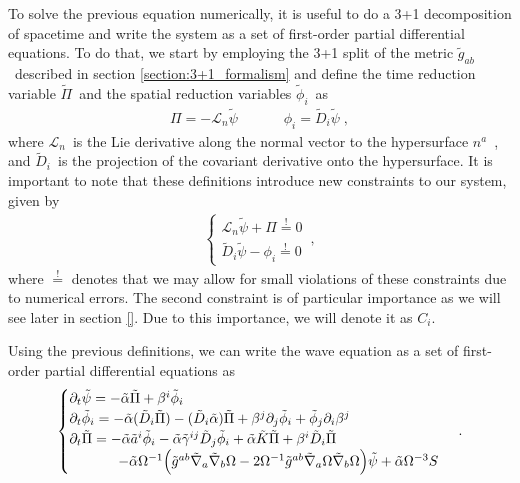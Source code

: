 To solve the previous equation numerically, it is useful to do a 3+1 decomposition of spacetime and write the system as a set of first-order partial differential equations. To do that, we start by employing the 3+1 split of the metric $\tilde{g}_{ab}$~described in section \ref{section:3+1_formalism} and define the time reduction variable $\tilde{\Pi}$~and the spatial reduction variables $\tilde{\phi}_i$~as
%
\begin{align}
    \Pi = - \mathcal{L}_n \tilde{\psi} \;  \quad \quad \quad \phi_i = \tilde{D}_i \tilde{\psi} \; ,
\end{align}
%
where $\mathcal{L}_n$~is the Lie derivative along the normal vector to the hypersurface $n^a$~, and $\tilde{D}_i$~is the projection of the covariant derivative onto the hypersurface. It is important to note that these definitions introduce new constraints to our system, given by
%
\begin{align}
    \begin{cases}
        \mathcal{L}_n \tilde{\psi} + \Pi \overset{!}{=} 0 \\
        \tilde{D}_i \tilde{\psi} - \phi_i \overset{!}{=} 0
    \end{cases}\,,
\end{align}
%
where $\overset{!}{=}$ denotes that we may allow for small violations of these constraints due to numerical errors. The second constraint is of particular importance as we will see later in section \ref{}. Due to this importance, we will denote it as $C_i$.

Using the previous definitions, we can write the wave equation as a set of first-order partial differential equations as
%
\begin{align}
    \begin{cases}
        \partial_t \tilde{\psi} = - \tilde{\alpha} \tilde{\Pi} + \beta^i \tilde{\phi}_i \\
        \partial_t \tilde{\phi}_i = - \tilde{\alpha} (\tilde{D}_i \tilde{\Pi}) - (\tilde{D}_i \tilde{\alpha}) \tilde{\Pi} + \beta^j \partial_j \tilde{\phi}_i + \tilde{\phi}_j \partial_i \beta^j \\
        \partial_t \tilde{\Pi} = - \tilde{\alpha} \tilde{a}^i \tilde{\phi}_i - \tilde{\alpha} \tilde{\gamma}^{ij} \tilde{D}_j \tilde{\phi}_i + \tilde{\alpha} \tilde{K} \tilde{\Pi} + \beta^i \tilde{D}_i \tilde{\Pi} \\
        \hspace{3.5em} - \tilde{\alpha} \Omega^{-1} \Big( \tilde{g}^{ab} \tilde{\nabla}_a \tilde{\nabla}_b \Omega - 2 \Omega^{-1} \tilde{g}^{ab} \tilde{\nabla}_a \Omega \tilde{\nabla}_b \Omega \Big) \tilde{\psi} + \tilde{\alpha} \Omega^{-3} S
    \end{cases}\,.
\end{align}

